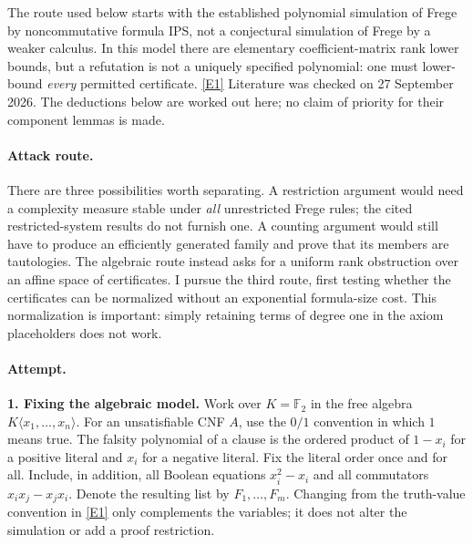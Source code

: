 \documentclass[11pt,a4paper]{article}
\newcommand{\eref}[2]{\hyperlink{extra:#1:#2}{[E#2]}}
\numberwithin{equation}{section}
\begin{document}
The route used below starts with the established polynomial simulation of
Frege by noncommutative formula IPS, not a conjectural simulation of Frege by a
weaker calculus. In this model there are elementary coefficient-matrix rank
lower bounds, but a refutation is not a uniquely specified polynomial:
one must lower-bound \emph{every} permitted certificate.
\eref{104}{1} Literature was checked on 27 September 2026. The deductions below
are worked out here; no claim of priority for their component lemmas is made.

\paragraph{Attack route.}
There are three possibilities worth separating. A restriction argument would
need a complexity measure stable under \emph{all} unrestricted Frege rules;
the cited restricted-system results do not furnish one. A counting argument
would still have to produce an efficiently generated family and prove that
its members are tautologies. The algebraic route instead asks for a uniform
rank obstruction over an affine space of certificates. I pursue the third
route, first testing whether the certificates can be normalized without an
exponential formula-size cost. This normalization is important: simply
retaining terms of degree one in the axiom placeholders does not work.

\paragraph{Attempt.}
\textbf{1. Fixing the algebraic model.}
Work over $K=\mathbb F_2$ in the free algebra $K\langle x_1,\ldots,x_n\rangle$.
For an unsatisfiable CNF $A$, use the $0/1$ convention in which $1$ means true.
The falsity polynomial of a clause is the ordered product of $1-x_i$ for a
positive literal and $x_i$ for a negative literal. Fix the literal order once
and for all. Include, in addition, all Boolean equations $x_i^2-x_i$ and all
commutators $x_ix_j-x_jx_i$. Denote the resulting list by $F_1,\ldots,F_m$.
Changing from the truth-value convention in \eref{104}{1} only complements the
variables; it does not alter the simulation or add a proof restriction.
\end{document}
